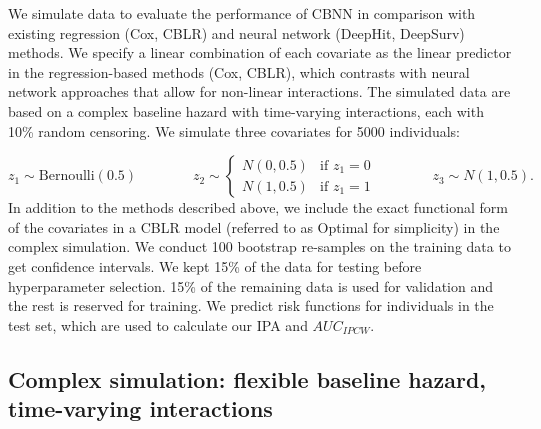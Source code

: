 \documentclass[APA,LATO1COL]{WileyNJD-v2}
\begin{document}
We simulate data to evaluate the performance of CBNN in comparison with existing regression (Cox, CBLR) and neural network (DeepHit, DeepSurv)
methods. We specify a linear combination of each covariate as the linear predictor in the regression-based methods (Cox, CBLR), which contrasts
with neural network approaches that allow for non-linear interactions. The simulated data are based on a complex baseline hazard with time-varying
interactions, each with 10\% random censoring. We simulate three covariates for 5000 individuals:

\[
z_{1} \sim \textrm{Bernoulli}(0.5) \qquad \qquad %
z_{2} \sim \begin{cases}
 N(0,0.5) & \textrm{if } z_{1}=0\\ 
 N(1,0.5) & \textrm{if } z_{1}=1
\end{cases} \qquad \qquad
z_{3} \sim N(1,0.5).
\]
In addition to the methods described above, we include the exact functional form of the covariates in a CBLR model (referred to as Optimal for simplicity)
in the complex simulation. We conduct 100 bootstrap re-samples on the training data to get confidence intervals. We kept 15\% of the data for testing before
hyperparameter selection. 15\% of the remaining data is used for validation and the rest is reserved for training. We predict risk functions for individuals in
the test set, which are used to calculate our IPA and $AUC_{IPCW}$. 





\hypertarget{complex-simulation-flexible-baseline-hazard-time-varying-interactions}{%
\subsection{Complex simulation: flexible baseline hazard, time-varying
interactions}\label{complex-simulation-flexible-baseline-hazard-time-varying-interactions}}
\end{document}
